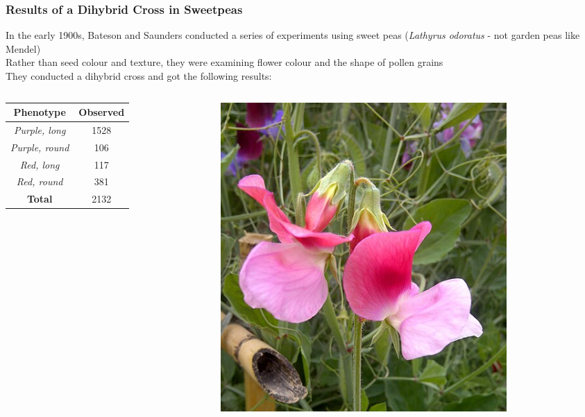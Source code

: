 \documentclass{beamer}
\begin{document}
	
	\begin{frame}
\frametitle{Results of a Dihybrid Cross in Sweetpeas}		

In the early 1900s, Bateson and Saunders conducted a series of experiments using sweet peas (\textit{Lathyrus odoratus} - not garden peas like Mendel) \\
\vspace{5pt}
Rather than seed colour and texture, they were examining flower colour and the shape of pollen grains\\
\vspace{5pt}
They conducted a dihybrid cross and got the following results:\\
\vspace{8pt}
\begin{center}
\begin{columns}

	\begin{column}{0.5\textwidth}
	\begin{tabular}{c|c}
		\textbf{Phenotype} & \textbf{Observed } \\
		\hline
		\textit{Purple, long}& 1528\\
		
		\textit{Purple, round}&106\\
		
		\textit{Red, long}&117\\
		
		\textit{Red, round}&381\\
		\hline
		\textbf{Total} & 2132\\
	\end{tabular}	

\end{column}
	\begin{column}{0.5\textwidth}
			\includegraphics[keepaspectratio, width  =0.75\textwidth]{img/sweetPea} 
	
\end{column}
\end{columns}
\end{center}


\end{frame}
	
\end{document}
